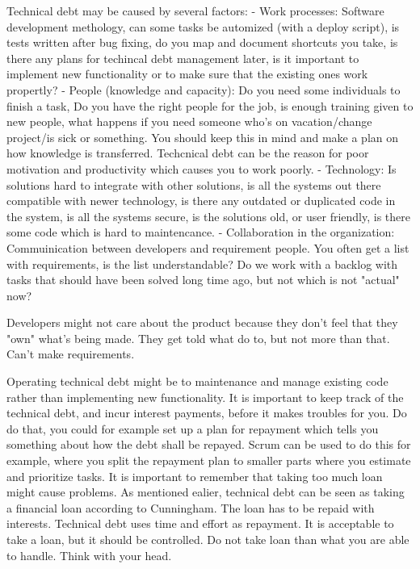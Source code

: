 Technical debt may be caused by several factors:
- Work processes: Software development methology, can some tasks be automized (with a deploy script), is tests written after bug fixing, do you map and document shortcuts you take, is there any plans for techincal debt management later, is it important to implement new functionality or to make sure that the existing ones work propertly?
- People (knowledge and capacity): Do you need some individuals to finish a task, Do you have the right people for the job, is enough training given to new people, what happens if you need someone who's on vacation/change project/is sick or something. You should keep this in mind and make a plan on how knowledge is transferred. Techcnical debt can be the reason for poor motivation and productivity which causes you to work poorly. 
- Technology: Is solutions hard to integrate with other solutions, is all the systems out there compatible with newer technology, is there any outdated or duplicated code in the system, is all the systems secure, is the solutions old, or user friendly, is there some code which is hard to maintencance. 
- Collaboration in the organization: Commuinication between developers and requirement people. You often get a list with requirements, is the list understandable? Do we work with a backlog with tasks that should have been solved long time ago, but not which is not "actual" now?

Developers might not care about the product because they don't feel that they "own" what's being made. They get told what do to, but not more than that. Can't make requirements.


Operating technical debt might be to maintenance and manage existing code rather than implementing new functionality. It is important to keep track of the technical debt, and incur interest payments, before it makes troubles for you. Do do that, you could for example set up a plan for repayment which tells you something about how the debt shall be repayed. Scrum can be used to do this for example, where you split the repayment plan to smaller parts where you estimate and prioritize tasks. It is important to remember that taking too much loan might cause problems. As mentioned ealier, technical debt can be seen as taking a financial loan according to Cunningham. The loan has to be repaid with interests. Technical debt uses time and effort as repayment. It is acceptable to take a loan, but it should be controlled. Do not take loan than what you are able to handle. Think with your head.


